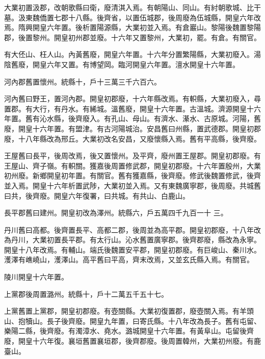 \begin{pinyinscope}
 大業初置汲郡，改朝歌縣曰衛，廢清淇入焉。有朝陽山、同山。有紂朝歌城、比干墓。汲東魏僑置七郡十八縣。後齊省，以置伍城郡，後周廢為伍城縣，開皇六年改焉。隋興開皇六年置。後析置陽源縣，大業初並入焉。有倉巖山。黎陽後魏置黎陽郡，後置黎州。開皇初州郡並廢。十六年又置黎州，大業初，罷。有倉。有關官。



 有大伾山、枉人山。內黃舊廢，開皇六年置。十六年分置繁陽縣，大業初廢入。湯陰舊廢，開皇六年又置。有博望岡。臨河開皇六年置。澶水開皇十六年置。



 河內郡舊置懷州。統縣十，戶十三萬三千六百六。



 河內舊曰野王，置河內郡。開皇初郡廢，十六年縣改焉。有軹縣，大業初廢入，尋置郡。有大行，有丹水。有絺城。溫舊廢，開皇十六年置。古溫城。濟源開皇十六年置。舊有沁水縣，後齊廢入。有孔山、母山。有濟水、濝水、古原城。河陽，舊廢，開皇十六年置。有盟津。有古河陽城治。安昌舊曰州縣，置武德郡。開皇初郡廢，十八年縣改為邢丘。大業初改名安昌，又廢懷縣入焉。舊有平高縣，後齊廢。



 王屋舊曰長平，後周改焉，後又置懷州。及平齊，廢州置王屋郡。開皇初郡廢。有王屋山、齊子嶺。有軹關。獲嘉後周置修武郡，開皇初郡廢。十六年置殷州，大業初州廢。新鄉開皇初年置。有關官。舊有獲嘉縣，後齊廢。修武後魏置修武，後齊並入焉。開皇十六年析置武陟，大業初並入焉。又有東魏廣寧郡，後周廢。共城舊曰共，後齊廢。開皇六年復署，曰共城。有共山、白鹿山。



 長平郡舊曰建州。開皇初改為澤州。統縣六，戶五萬四千九百一十
 三。



 丹川舊曰高都。後齊置長平、高都二郡，後周並為高平郡。開皇初郡廢，十八年改為丹川，大業初置長平郡。有太行山。沁水舊置廣寧郡。後齊郡廢，縣改為永寧。開皇十八年改焉。有輔山。端氏後魏置安平郡，開皇初郡廢。有巨峻山、秦川水。濩澤有嶕嶢山，濩澤山。高平舊曰平高，齊末改焉，又並玄氏縣入焉。有關官。



 陵川開皇十六年置。



 上黨郡後周置潞州。統縣十，戶十二萬五千五十七。



 上黨舊置上黨郡，開皇初郡廢。有壺關縣。大業初復置郡，廢壺關入焉。有羊頭山、抱犢山。長子後齊廢。開皇九年置，曰寄氏縣。十八年改為長子。舊有屯留、樂陽二縣，後齊廢。有濁漳水、堯水。潞城開皇十六年置。有黃阜山。屯留後齊廢，開皇十六年復。襄垣舊置襄垣郡，後齊郡廢。後周置韓州，大業初州廢。有鹿臺山。




\end{pinyinscope}
